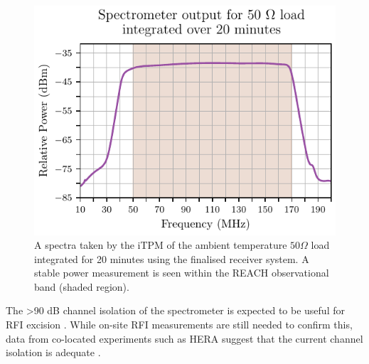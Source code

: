 \begin{figure}
    \centering
    \includegraphics{psd_cold}
    \caption{A spectra taken by the iTPM of the ambient temperature $50 \Omega$ load integrated for 20 minutes using the finalised receiver system. A stable power measurement is seen within the REACH observational band (shaded region).}
    \label{fig:psd_cold}
\end{figure}
The >90 dB channel isolation of the spectrometer is expected to be useful for RFI excision \citep{itpm}. While on-site RFI measurements are still needed to confirm this, data from co-located experiments such as HERA suggest that the current channel isolation is adequate \citep{hera}.


